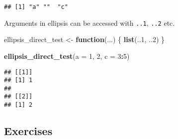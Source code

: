 \documentclass[]{book}
\newenvironment{Shaded}{\begin{snugshade}}{\end{snugshade}}
\newcommand{\ControlFlowTok}[1]{\textcolor[rgb]{0.13,0.29,0.53}{\textbf{#1}}}
\newcommand{\DataTypeTok}[1]{\textcolor[rgb]{0.13,0.29,0.53}{#1}}
\newcommand{\DecValTok}[1]{\textcolor[rgb]{0.00,0.00,0.81}{#1}}
\newcommand{\KeywordTok}[1]{\textcolor[rgb]{0.13,0.29,0.53}{\textbf{#1}}}
\newcommand{\NormalTok}[1]{#1}
\newcommand{\OperatorTok}[1]{\textcolor[rgb]{0.81,0.36,0.00}{\textbf{#1}}}
\newcommand{\StringTok}[1]{\textcolor[rgb]{0.31,0.60,0.02}{#1}}
\begin{document}
\begin{verbatim}
## [1] "a" ""  "c"
\end{verbatim}

Arguments in ellipsis can be accessed with \texttt{..1}, \texttt{..2} etc.

\begin{Shaded}
\begin{Highlighting}[]
\NormalTok{ellipsis_direct_test <-}\StringTok{ }\ControlFlowTok{function}\NormalTok{(...) \{}
  \KeywordTok{list}\NormalTok{(..}\DecValTok{1}\NormalTok{, ..}\DecValTok{2}\NormalTok{)}
\NormalTok{\}}

\KeywordTok{ellipsis_direct_test}\NormalTok{(}\DataTypeTok{a =} \DecValTok{1}\NormalTok{, }\DecValTok{2}\NormalTok{, }\DataTypeTok{c =} \DecValTok{3}\OperatorTok{:}\DecValTok{5}\NormalTok{)}
\end{Highlighting}
\end{Shaded}

\begin{verbatim}
## [[1]]
## [1] 1
## 
## [[2]]
## [1] 2
\end{verbatim}

\hypertarget{exercises-5}{%
\subsection{Exercises}\label{exercises-5}}
\end{document}
